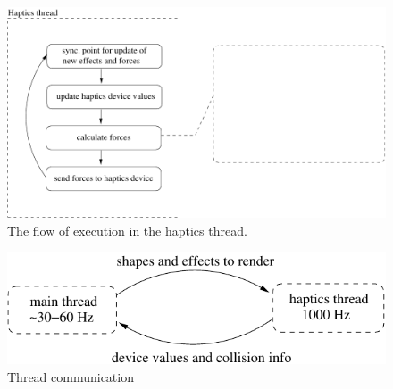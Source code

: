\begin{figure} 
  \centering 
  \includegraphics{images/hapticsthread.pdf}
  \caption{The flow of execution in the haptics thread.}
  \label{haptics thread} 
\end{figure}

\begin{figure} 
  \centering 
  \includegraphics{images/threads.pdf}
  \caption{Thread communication}
  \label{threads} 
\end{figure}